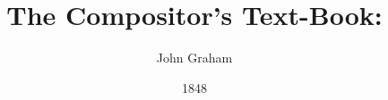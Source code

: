 \documentclass[letterpaper,12pt]{book}
\begin{document}
\frontmatter
\title{The Compositor's Text-Book:}
\author{John Graham}
\date{1848}
\maketitle
\tableofcontents
\mainmatter{}

\end{document}
